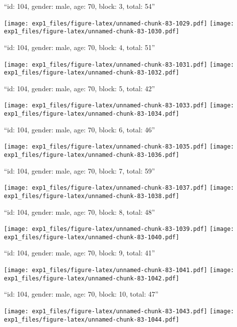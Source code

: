 \documentclass[11pt,,]{article}
\begin{document}
\newpage
[1] 

``id: 104, gender: male, age: 70, block: 3, total: 54''

\texttt{[image: exp1\_files/figure-latex/unnamed-chunk-83-1029.pdf]}
\texttt{[image: exp1\_files/figure-latex/unnamed-chunk-83-1030.pdf]}

\newpage
[1] 

``id: 104, gender: male, age: 70, block: 4, total: 51''

\texttt{[image: exp1\_files/figure-latex/unnamed-chunk-83-1031.pdf]}
\texttt{[image: exp1\_files/figure-latex/unnamed-chunk-83-1032.pdf]}

\newpage
[1] 

``id: 104, gender: male, age: 70, block: 5, total: 42''

\texttt{[image: exp1\_files/figure-latex/unnamed-chunk-83-1033.pdf]}
\texttt{[image: exp1\_files/figure-latex/unnamed-chunk-83-1034.pdf]}

\newpage
[1] 

``id: 104, gender: male, age: 70, block: 6, total: 46''

\texttt{[image: exp1\_files/figure-latex/unnamed-chunk-83-1035.pdf]}
\texttt{[image: exp1\_files/figure-latex/unnamed-chunk-83-1036.pdf]}

\newpage
[1] 

``id: 104, gender: male, age: 70, block: 7, total: 59''

\texttt{[image: exp1\_files/figure-latex/unnamed-chunk-83-1037.pdf]}
\texttt{[image: exp1\_files/figure-latex/unnamed-chunk-83-1038.pdf]}

\newpage
[1] 

``id: 104, gender: male, age: 70, block: 8, total: 48''

\texttt{[image: exp1\_files/figure-latex/unnamed-chunk-83-1039.pdf]}
\texttt{[image: exp1\_files/figure-latex/unnamed-chunk-83-1040.pdf]}

\newpage
[1] 

``id: 104, gender: male, age: 70, block: 9, total: 41''

\texttt{[image: exp1\_files/figure-latex/unnamed-chunk-83-1041.pdf]}
\texttt{[image: exp1\_files/figure-latex/unnamed-chunk-83-1042.pdf]}

\newpage
[1] 

``id: 104, gender: male, age: 70, block: 10, total: 47''

\texttt{[image: exp1\_files/figure-latex/unnamed-chunk-83-1043.pdf]}
\texttt{[image: exp1\_files/figure-latex/unnamed-chunk-83-1044.pdf]}
\end{document}
